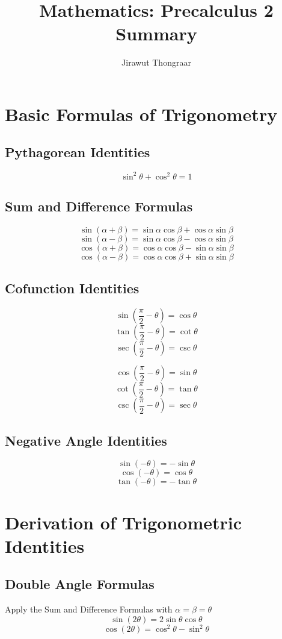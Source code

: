 \documentclass[a4paper,12pt]{article}
\title{Mathematics: Precalculus 2 Summary}
\author{Jirawut Thongraar}
\begin{document}
\maketitle

\section{Basic Formulas of Trigonometry}

\subsection{Pythagorean Identities}
$$\sin^2\theta+\cos^2\theta=1$$

\subsection{Sum and Difference Formulas}
$$\sin(\alpha+\beta)=\sin\alpha\cos\beta+\cos\alpha\sin\beta$$
$$\sin(\alpha-\beta)=\sin\alpha\cos\beta-\cos\alpha\sin\beta$$
$$\cos(\alpha+\beta)=\cos\alpha\cos\beta-\sin\alpha\sin\beta$$
$$\cos(\alpha-\beta)=\cos\alpha\cos\beta+\sin\alpha\sin\beta$$

\subsection{Cofunction Identities}
\begin{multicols}{2}
	$$\sin(\frac{\pi}{2}-\theta)=\cos\theta$$
	$$\tan(\frac{\pi}{2}-\theta)=\cot\theta$$
	$$\sec(\frac{\pi}{2}-\theta)=\csc\theta$$
	
	$$\cos(\frac{\pi}{2}-\theta)=\sin\theta$$
	$$\cot(\frac{\pi}{2}-\theta)=\tan\theta$$
	$$\csc(\frac{\pi}{2}-\theta)=\sec\theta$$
\end{multicols}

\subsection{Negative Angle Identities}
$$\sin(-\theta)=-\sin\theta$$
$$\cos(-\theta)=\cos\theta$$
$$\tan(-\theta)=-\tan\theta$$

\section{Derivation of Trigonometric Identities}

\subsection{Double Angle Formulas}
Apply the Sum and Difference Formulas with $\alpha=\beta=\theta$
$$\sin(2\theta)=2\sin\theta\cos\theta$$
$$\cos(2\theta)=\cos^2\theta-\sin^2\theta$$
\end{document}
